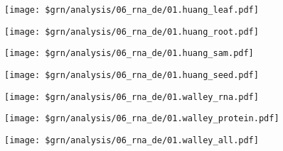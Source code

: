 \documentclass[11pt,]{article}
\let\origfigure\figure
\let\endorigfigure\endfigure
\renewenvironment{figure}[1][2] {
    \expandafter\origfigure\expandafter[H]
} {
    \endorigfigure
}
\begin{document}
\pagebreak

\begin{figure}
\centering
\texttt{[image: \$grn/analysis/06\_rna\_de/01.huang\_leaf.pdf]}
\caption{Figure 2a}
\end{figure}

\pagebreak

\begin{figure}
\centering
\texttt{[image: \$grn/analysis/06\_rna\_de/01.huang\_root.pdf]}
\caption{Figure 2b}
\end{figure}

\pagebreak

\begin{figure}
\centering
\texttt{[image: \$grn/analysis/06\_rna\_de/01.huang\_sam.pdf]}
\caption{Figure 2c}
\end{figure}

\pagebreak

\begin{figure}
\centering
\texttt{[image: \$grn/analysis/06\_rna\_de/01.huang\_seed.pdf]}
\caption{Figure 2d}
\end{figure}

\pagebreak

\begin{figure}
\centering
\texttt{[image: \$grn/analysis/06\_rna\_de/01.walley\_rna.pdf]}
\caption{Figure 2e}
\end{figure}

\pagebreak

\begin{figure}
\centering
\texttt{[image: \$grn/analysis/06\_rna\_de/01.walley\_protein.pdf]}
\caption{Figure 2f}
\end{figure}

\pagebreak

\begin{figure}
\centering
\texttt{[image: \$grn/analysis/06\_rna\_de/01.walley\_all.pdf]}
\caption{Figure 2g}
\end{figure}
\newpage
\singlespacing 
\end{document}
